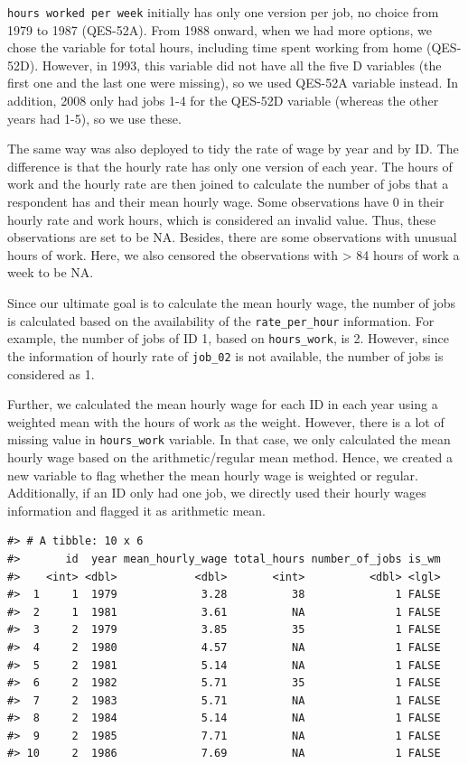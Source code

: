 \documentclass{article}
\begin{document}
\texttt{hours\ worked\ per\ week} initially has only one version per job, no choice from 1979 to 1987 (QES-52A). From 1988 onward, when we had more options, we chose the variable for total hours, including time spent working from home (QES-52D). However, in 1993, this variable did not have all the five D variables (the first one and the last one were missing), so we used QES-52A variable instead. In addition, 2008 only had jobs 1-4 for the QES-52D variable (whereas the other years had 1-5), so we use these.

The same way was also deployed to tidy the rate of wage by year and by ID. The difference is that the hourly rate has only one version of each year. The hours of work and the hourly rate are then joined to calculate the number of jobs that a respondent has and their mean hourly wage. Some observations have 0 in their hourly rate and work hours, which is considered an invalid value. Thus, these observations are set to be NA. Besides, there are some observations with unusual hours of work. Here, we also censored the observations with \textgreater{} 84 hours of work a week to be NA.

Since our ultimate goal is to calculate the mean hourly wage, the number of jobs is calculated based on the availability of the \texttt{rate\_per\_hour} information. For example, the number of jobs of ID 1, based on \texttt{hours\_work}, is 2. However, since the information of hourly rate of \texttt{job\_02} is not available, the number of jobs is considered as 1.

Further, we calculated the mean hourly wage for each ID in each year using a weighted mean with the hours of work as the weight. However, there is a lot of missing value in \texttt{hours\_work} variable. In that case, we only calculated the mean hourly wage based on the arithmetic/regular mean method. Hence, we created a new variable to flag whether the mean hourly wage is weighted or regular. Additionally, if an ID only had one job, we directly used their hourly wages information and flagged it as arithmetic mean.

\begin{verbatim}
#> # A tibble: 10 x 6
#>       id  year mean_hourly_wage total_hours number_of_jobs is_wm
#>    <int> <dbl>            <dbl>       <int>          <dbl> <lgl>
#>  1     1  1979             3.28          38              1 FALSE
#>  2     1  1981             3.61          NA              1 FALSE
#>  3     2  1979             3.85          35              1 FALSE
#>  4     2  1980             4.57          NA              1 FALSE
#>  5     2  1981             5.14          NA              1 FALSE
#>  6     2  1982             5.71          35              1 FALSE
#>  7     2  1983             5.71          NA              1 FALSE
#>  8     2  1984             5.14          NA              1 FALSE
#>  9     2  1985             7.71          NA              1 FALSE
#> 10     2  1986             7.69          NA              1 FALSE
\end{verbatim}
\end{document}
